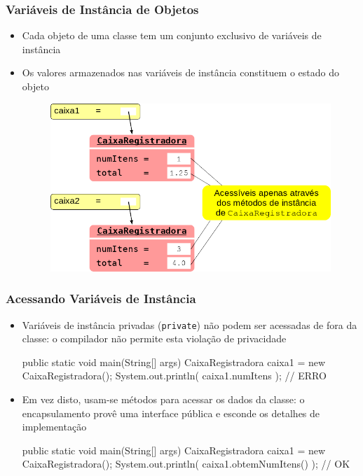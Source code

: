 \documentclass[xcolor={dvipsnames,table},aspectratio=169]{beamer}
\begin{document}
\begin{frame}\frametitle{Variáveis de Instância de Objetos}
\begin{itemize}
	\item Cada objeto de uma classe tem um conjunto exclusivo de variáveis de instância
	\item Os valores armazenados nas variáveis de instância constituem o estado do objeto
\begin{figure}[h]
	\includegraphics[height=0.55\paperheight,center]{pucrs-ep-fprog-unidade_07-objetos_e_classes-laminas-objetos_caixaregistradora.png}
\end{figure}
\end{itemize}
\end{frame}

\begin{frame}[fragile]\frametitle{Acessando Variáveis de Instância}
\begin{itemize}
	\item Variáveis de instância privadas (\texttt{private}) não podem ser acessadas de fora da classe: o compilador não permite esta violação de privacidade
{\footnotesize
\begin{javacode}
public static void main(String[] args) {
  CaixaRegistradora caixa1 = new CaixaRegistradora();
  System.out.println( caixa1.numItens ); // ERRO
}
\end{javacode}
}
	\item Em vez disto, usam-se métodos para acessar os dados da classe: o encapsulamento provê uma interface pública e esconde os detalhes de implementação
{\footnotesize
\begin{javacode}
public static void main(String[] args) {
  CaixaRegistradora caixa1 = new CaixaRegistradora();
  System.out.println( caixa1.obtemNumItens() ); // OK
}
\end{javacode}
}
\end{itemize}
\end{frame}
\end{document}

